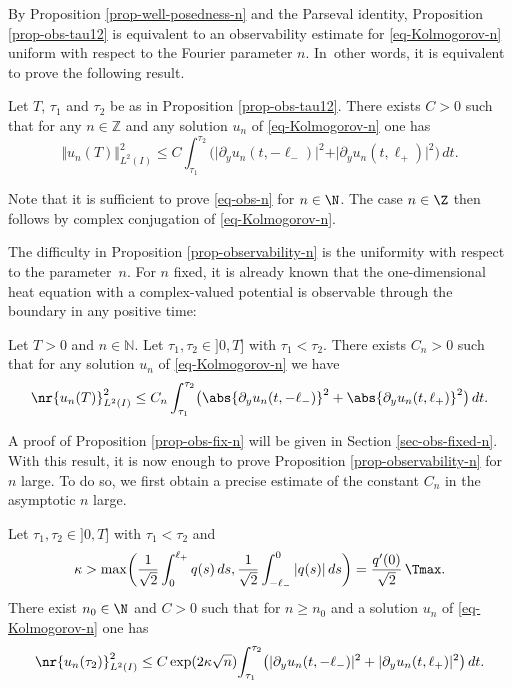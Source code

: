 By Proposition \ref{prop-well-posedness-n} and the Parseval identity, Proposition \ref{prop-obs-tau12} is equivalent to an observability estimate for \eqref{eq-Kolmogorov-n} uniform with respect to the Fourier parameter $n$. In~other words, it is equivalent to prove the following result.

\begin{proposition} \label{prop-observability-n}
Let $T$, $\tau_1$ and $\tau_2$ be as in Proposition \ref{prop-obs-tau12}. There exists $C>0$ such that for any $n \in \mathbb{Z}$ and any solution $u_n$ of \eqref{eq-Kolmogorov-n} one has
\begin{equation} \label{eq-obs-n}
\Vert u_n(T) \Vert_{L^2(I)}^2 \leq C \int_{\tau_1}^{\tau_2} \bigl(\vert \partial_y u_n(t,-\ell_-)\vert^2 + \vert \partial_y u_n(t,\ell_+) \vert^2 \bigr) \, dt.
\end{equation}
\end{proposition}

Note that it is sufficient to prove \eqref{eq-obs-n} for $n \in \N$. The case $n \in \Z$ then follows by complex conjugation of \eqref{eq-Kolmogorov-n}.

The difficulty in Proposition \ref{prop-observability-n} is the uniformity with respect to the parameter~$n$. For $n$ fixed, it is already known that the one-dimensional heat equation with a complex-valued potential is observable through the boundary in any positive time:

\begin{proposition} \label{prop-obs-fix-n}
Let $T>0$ and $n \in \mathbb{N}$. Let $\tau_1,\tau_2 \in{}]0,T]$ with $\tau_1 < \tau_2$. There exists $C_n > 0$ such that for any solution $u_n$ of \eqref{eq-Kolmogorov-n} we have
\begin{equation} \label{equ_obsineq_fixedn}
\nr{u_n(T)}_{L^2(I)}^2 \leq C_n \int_{\tau_1}^{\tau_2} \bigl(\abs {\partial_y u_n(t,-\ell_-)}^2 + \abs{\partial_y u_n(t,\ell_+)}^2 \bigr) \, dt.
\end{equation}
\end{proposition}

A proof of Proposition \ref{prop-obs-fix-n} will be given in Section \ref{sec-obs-fixed-n}. With this result, it is now enough to prove Proposition \ref{prop-observability-n} for $n$ large. To do so, we first obtain a precise estimate
of the constant $C_n$ in the asymptotic $n$ large.

\begin{proposition} \label{prop-obs-large-n}
Let $\tau_1,\tau_2 \in{}]0,T]$ with $\tau_1 < \tau_2$ and
\[
\kappa > \max \biggl(\frac 1 {\sqrt 2} \int_0^{\ell_+} q(s) \, ds , \frac 1 {\sqrt 2} \int_{-\ell_-}^{0} \vert q(s)\vert \, ds \biggr) = \frac {q'(0)}{\sqrt 2}\, \Tmax.
\]
There exist $n_0 \in \N$ and $C > 0$ such that for $n \geq n_0$ and a solution $u_n$ of \eqref{eq-Kolmogorov-n} one has
\[
\nr{u_n(\tau_2)}_{L^2(I)}^2 \leq C \exp(2 \kappa \sqrt{n}) {\int_{\tau_1}^{\tau_2} \bigl(\vert \partial_y u_n(t,-\ell_-)\vert^2 + \vert \partial_y u_n(t,\ell_+) \vert^2 \bigr) \, dt}.
\]
\end{proposition}

